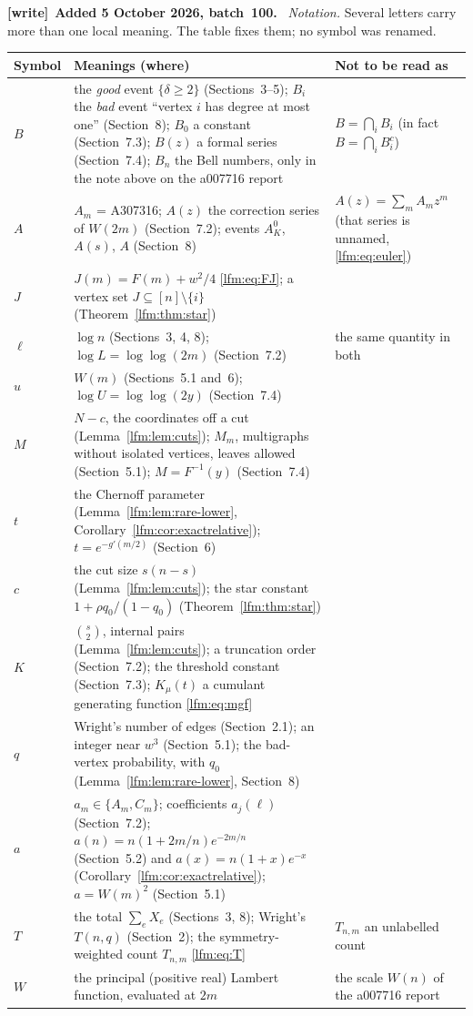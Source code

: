 \documentclass[11pt,letterpaper]{article}
\theoremstyle{remark}\newtheorem{remark}[theorem]{Remark}
\newenvironment{writenote}[1][]{\par\smallskip\begingroup\small
 \noindent\textbf{[write]}\if\relax\detokenize{#1}\relax\else~\textbf{#1.}\fi\ }%
 {\par\endgroup\smallskip}
\begin{document}
\begin{writenote}[Added 5 October 2026, batch~100]
\emph{Notation.} Several letters carry more than one local meaning. The
table fixes them; no symbol was renamed.

\smallskip
\noindent\begin{tabular}{@{}p{0.55in}p{3.75in}p{1.95in}@{}}
\toprule
Symbol & Meanings (where) & Not to be read as\\
\midrule
$B$ & the \emph{good} event $\{\delta\ge2\}$ (Sections~3--5); $B_i$ the
 \emph{bad} event ``vertex $i$ has degree at most one'' (Section~8); $B_0$ a
 constant (Section~7.3); $B(z)$ a formal series (Section~7.4); $B_n$ the
 Bell numbers, only in the note above on the a007716 report &
 $B=\bigcap_iB_i$ (in fact $B=\bigcap_iB_i^c$)\\
$A$ & $A_m$ = A307316; $A(z)$ the correction series of $W(2m)$
 (Section~7.2); events $A_K^0$, $A(s)$, $A$ (Section~8) &
 $A(z)=\sum_mA_mz^m$ (that series is unnamed, \eqref{lfm:eq:euler})\\
$J$ & $J(m)=F(m)+w^2/4$ \eqref{lfm:eq:FJ}; a vertex set
 $J\subseteq[n]\setminus\{i\}$ (Theorem~\ref{lfm:thm:star}) & \\
$\ell$ & $\log n$ (Sections~3, 4, 8); $\log L=\log\log(2m)$ (Section~7.2) &
 the same quantity in both\\
$u$ & $W(m)$ (Sections~5.1 and~6); $\log U=\log\log(2y)$ (Section~7.4) & \\
$M$ & $N-c$, the coordinates off a cut (Lemma~\ref{lfm:lem:cuts}); $M_m$,
 multigraphs without isolated vertices, leaves allowed (Section~5.1);
 $M=F^{-1}(y)$ (Section~7.4) & \\
$t$ & the Chernoff parameter (Lemma~\ref{lfm:lem:rare-lower},
 Corollary~\ref{lfm:cor:exactrelative}); $t=e^{-g'(m/2)}$ (Section~6) & \\
$c$ & the cut size $s(n-s)$ (Lemma~\ref{lfm:lem:cuts}); the star constant
 $1+\rho q_0/(1-q_0)$ (Theorem~\ref{lfm:thm:star}) & \\
$K$ & $\binom s2$, internal pairs (Lemma~\ref{lfm:lem:cuts}); a truncation
 order (Section~7.2); the threshold constant (Section~7.3); $K_\mu(t)$ a
 cumulant generating function \eqref{lfm:eq:mgf} & \\
$q$ & Wright's number of edges (Section~2.1); an integer near $w^3$
 (Section~5.1); the bad-vertex probability, with $q_0$
 (Lemma~\ref{lfm:lem:rare-lower}, Section~8) & \\
$a$ & $a_m\in\{A_m,C_m\}$; coefficients $a_j(\ell)$ (Section~7.2);
 $a(n)=n(1+2m/n)e^{-2m/n}$ (Section~5.2) and $a(x)=n(1+x)e^{-x}$
 (Corollary~\ref{lfm:cor:exactrelative}); $a=W(m)^2$ (Section~5.1) & \\
$T$ & the total $\sum_eX_e$ (Sections~3, 8); Wright's $T(n,q)$ (Section~2);
 the symmetry-weighted count $T_{n,m}$ \eqref{lfm:eq:T} &
 $T_{n,m}$ an unlabelled count\\
$W$ & the principal (positive real) Lambert function, evaluated at $2m$ &
 the scale $W(n)$ of the a007716 report\\
\bottomrule
\end{tabular}
\smallskip


\end{writenote}
\end{document}
